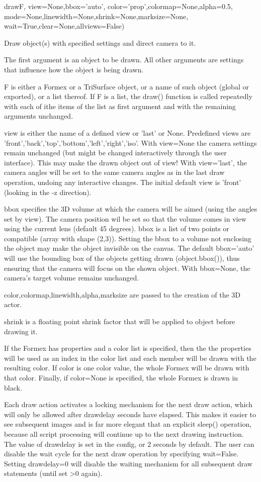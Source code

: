 \begin{funcdesc}{draw}{F, view=None,bbox='auto',
         color='prop',colormap=None,alpha=0.5,
         mode=None,linewidth=None,shrink=None,marksize=None,
         wait=True,clear=None,allviews=False)}

Draw object(s) with specified settings and direct camera to it.

The first argument is an object to be drawn. All other arguments are
settings that influence how  the object is being drawn.

F is either a Formex or a TriSurface object, or a name of such object
(global or exported), or a list thereof.
If F is a list, the draw() function is called repeatedly with each of
ithe items of the list as first argument and with the remaining arguments
unchanged.

view is either the name of a defined view or 'last' or None.
Predefined views are 'front','back','top','bottom','left','right','iso'.
With view=None the camera settings remain unchanged (but might be changed
interactively through the user interface). This may make the drawn object
out of view!
With view='last', the camera angles will be set to the same camera angles
as in the last draw operation, undoing any interactive changes.
The initial default view is 'front' (looking in the -z direction).

bbox specifies the 3D volume at which the camera will be aimed (using the
angles set by view). The camera position wil be set so that the volume
comes in view using the current lens (default 45 degrees).
bbox is a list of two points or compatible (array with shape (2,3)).
Setting the bbox to a volume not enclosing the object may make the object
invisible on the canvas.
The default bbox='auto' will use the bounding box of the objects getting
drawn (object.bbox()), thus ensuring that the camera will focus on the
shown object.
With bbox=None, the camera's target volume remains unchanged.

color,colormap,linewidth,alpha,marksize are passed to the
creation of the 3D actor.

shrink is a floating point shrink factor that will be applied to object
before drawing it.

If the Formex has properties and a color list is specified, then the
the properties will be used as an index in the color list and each member
will be drawn with the resulting color.
If color is one color value, the whole Formex will be drawn with
that color.
Finally, if color=None is specified, the whole Formex is drawn in black.

Each draw action activates a locking mechanism for the next draw action,
which will only be allowed after drawdelay seconds have elapsed. This
makes it easier to see subsequent images and is far more elegant that an
explicit sleep() operation, because all script processing will continue
up to the next drawing instruction.
The value of drawdelay is set in the config, or 2 seconds by default.
The user can disable the wait cycle for the next draw operation by
specifying wait=False. Setting drawdelay=0 will disable the waiting
mechanism for all subsequent draw statements (until set >0 again).

\end{funcdesc}
